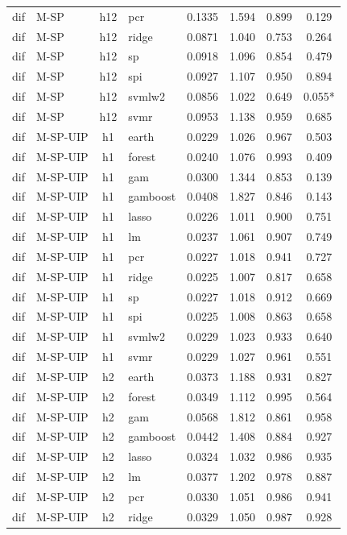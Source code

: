 \begin{ThreePartTable}
\begin{longtable}[t]{llclcccc}
dif & M-SP & h12 & pcr & 0.1335 & 1.594 & 0.899 & 0.129\\
dif & M-SP & h12 & ridge & 0.0871 & 1.040 & 0.753 & 0.264\\
dif & M-SP & h12 & sp & 0.0918 & 1.096 & 0.854 & 0.479\\
dif & M-SP & h12 & spi & 0.0927 & 1.107 & 0.950 & 0.894\\
dif & M-SP & h12 & svmlw2 & 0.0856 & 1.022 & 0.649 & 0.055*\\
dif & M-SP & h12 & svmr & 0.0953 & 1.138 & 0.959 & 0.685\\
\addlinespace
dif & M-SP-UIP & h1 & earth & 0.0229 & 1.026 & 0.967 & 0.503\\
dif & M-SP-UIP & h1 & forest & 0.0240 & 1.076 & 0.993 & 0.409\\
dif & M-SP-UIP & h1 & gam & 0.0300 & 1.344 & 0.853 & 0.139\\
dif & M-SP-UIP & h1 & gamboost & 0.0408 & 1.827 & 0.846 & 0.143\\
dif & M-SP-UIP & h1 & lasso & 0.0226 & 1.011 & 0.900 & 0.751\\
dif & M-SP-UIP & h1 & lm & 0.0237 & 1.061 & 0.907 & 0.749\\
dif & M-SP-UIP & h1 & pcr & 0.0227 & 1.018 & 0.941 & 0.727\\
dif & M-SP-UIP & h1 & ridge & 0.0225 & 1.007 & 0.817 & 0.658\\
dif & M-SP-UIP & h1 & sp & 0.0227 & 1.018 & 0.912 & 0.669\\
dif & M-SP-UIP & h1 & spi & 0.0225 & 1.008 & 0.863 & 0.658\\
dif & M-SP-UIP & h1 & svmlw2 & 0.0229 & 1.023 & 0.933 & 0.640\\
dif & M-SP-UIP & h1 & svmr & 0.0229 & 1.027 & 0.961 & 0.551\\
\addlinespace
dif & M-SP-UIP & h2 & earth & 0.0373 & 1.188 & 0.931 & 0.827\\
dif & M-SP-UIP & h2 & forest & 0.0349 & 1.112 & 0.995 & 0.564\\
dif & M-SP-UIP & h2 & gam & 0.0568 & 1.812 & 0.861 & 0.958\\
dif & M-SP-UIP & h2 & gamboost & 0.0442 & 1.408 & 0.884 & 0.927\\
dif & M-SP-UIP & h2 & lasso & 0.0324 & 1.032 & 0.986 & 0.935\\
dif & M-SP-UIP & h2 & lm & 0.0377 & 1.202 & 0.978 & 0.887\\
dif & M-SP-UIP & h2 & pcr & 0.0330 & 1.051 & 0.986 & 0.941\\
dif & M-SP-UIP & h2 & ridge & 0.0329 & 1.050 & 0.987 & 0.928\\

\end{longtable}
\end{ThreePartTable}
